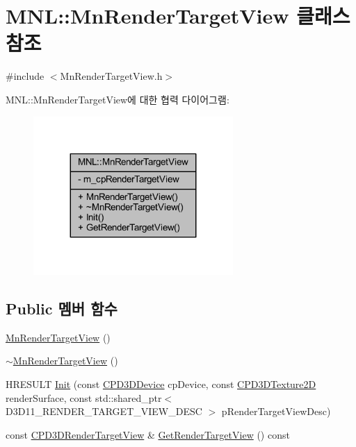 \hypertarget{class_m_n_l_1_1_mn_render_target_view}{}\section{M\+NL\+:\+:Mn\+Render\+Target\+View 클래스 참조}
\label{class_m_n_l_1_1_mn_render_target_view}


{\ttfamily \#include $<$Mn\+Render\+Target\+View.\+h$>$}



M\+NL\+:\+:Mn\+Render\+Target\+View에 대한 협력 다이어그램\+:\nopagebreak
\begin{figure}[H]
\begin{center}
\leavevmode
\includegraphics[width=215pt]{class_m_n_l_1_1_mn_render_target_view__coll__graph}
\end{center}
\end{figure}
\subsection*{Public 멤버 함수}
\begin{DoxyCompactItemize}
\item 
\hyperlink{class_m_n_l_1_1_mn_render_target_view_a92e6aa65b1ef005a686e84dcb86030bc}{Mn\+Render\+Target\+View} ()
\item 
\hyperlink{class_m_n_l_1_1_mn_render_target_view_ac9ac7026ded25a57359f42085a21d736}{$\sim$\+Mn\+Render\+Target\+View} ()
\item 
H\+R\+E\+S\+U\+LT \hyperlink{class_m_n_l_1_1_mn_render_target_view_a4ca6cfdd184cec57e8a8d2e1c87e6bbb}{Init} (const \hyperlink{namespace_m_n_l_a1eec210db8f309a4a9ac0d9658784c31}{C\+P\+D3\+D\+Device} cp\+Device, const \hyperlink{namespace_m_n_l_addb538e1cbd1f443e6db5e6312487c51}{C\+P\+D3\+D\+Texture2D} render\+Surface, const std\+::shared\+\_\+ptr$<$ D3\+D11\+\_\+\+R\+E\+N\+D\+E\+R\+\_\+\+T\+A\+R\+G\+E\+T\+\_\+\+V\+I\+E\+W\+\_\+\+D\+E\+SC $>$ p\+Render\+Target\+View\+Desc)
\item 
const \hyperlink{namespace_m_n_l_aa08a7c0b5ac9d877dacb57b9306b7b8c}{C\+P\+D3\+D\+Render\+Target\+View} \& \hyperlink{class_m_n_l_1_1_mn_render_target_view_a71de34bb20d238b13449b776a1d8572d}{Get\+Render\+Target\+View} () const
\end{DoxyCompactItemize}
